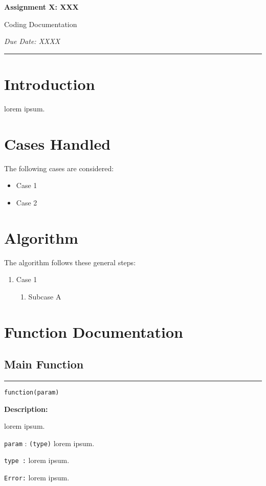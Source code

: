 \documentclass[12pt]{article}
\begin{document}
\begin{center}
\textbf{\huge Assignment X: XXX}

{\Large{Coding Documentation}}

{\large\emph{Due Date: XXXX}}
\vspace{1em}
\end{center}
\hrule

\section*{Introduction}

lorem ipsum.

\section*{Cases Handled}
The following cases are considered:
\begin{itemize}
    \item Case 1
    \item Case 2
\end{itemize}

\section*{Algorithm}
The algorithm follows these general steps:
\begin{enumerate}
    \item Case 1
    \begin{enumerate}
        \item Subcase A
    \end{enumerate}
\end{enumerate}

\section*{Function Documentation}
\subsection*{Main Function\\} 
\hrule
{\large\texttt{function(param)}}

\textbf{Description:}

lorem ipsum.

\begin{description}
    \item[Parameters:] 
    \item \texttt{param} : \texttt{(type)} lorem ipsum.

    \item[Returns:] 
    \item \texttt{type :} lorem ipsum.

    \item[Raises:] 
    \item \texttt{Error:} lorem ipsum. \\
\end{description}
\end{document}
